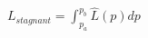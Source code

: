 \documentclass[10pt]{article}
\begin{document}
$L_{stagnant} = \int_{p_{a}}^{p_{b}}\hat{L}(p)dp$
\end{document}
